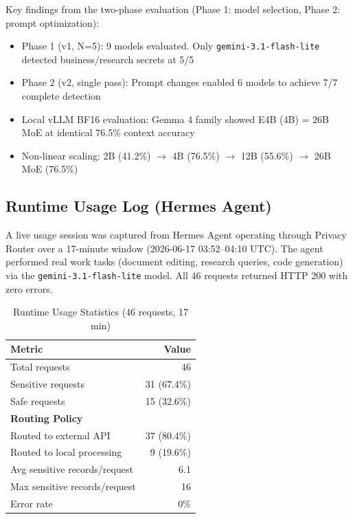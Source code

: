 \documentclass[11pt,a4paper]{article}
\begin{document}
Key findings from the two-phase evaluation (Phase 1: model selection, Phase 2: prompt optimization):

\begin{itemize}[nosep]
  \item Phase 1 (v1, N=5): 9 models evaluated. Only \texttt{gemini-3.1-flash-lite} detected business/research secrets at 5/5
  \item Phase 2 (v2, single pass): Prompt changes enabled 6 models to achieve 7/7 complete detection
  \item Local vLLM BF16 evaluation: Gemma 4 family showed E4B (4B) = 26B MoE at identical 76.5\% context accuracy
  \item Non-linear scaling: 2B (41.2\%) $\rightarrow$ 4B (76.5\%) $\rightarrow$ 12B (55.6\%) $\rightarrow$ 26B MoE (76.5\%)
\end{itemize}

\subsection{Runtime Usage Log (Hermes Agent)}

A live usage session was captured from Hermes Agent operating through Privacy Router over a 17-minute window (2026-06-17 03:52--04:10 UTC). The agent performed real work tasks (document editing, research queries, code generation) via the \texttt{gemini-3.1-flash-lite} model. All 46 requests returned HTTP 200 with zero errors.

\begin{table}[h]
\centering
\begin{tabular}{@{}lr@{}}
\toprule
Metric & Value \\
\midrule
Total requests & 46 \\
Sensitive requests & 31 (67.4\%) \\
Safe requests & 15 (32.6\%) \\
\midrule
\multicolumn{2}{l}{\textbf{Routing Policy}} \\
\quad Routed to external API & 37 (80.4\%) \\
\quad Routed to local processing & 9 (19.6\%) \\
\midrule
Avg sensitive records/request & 6.1 \\
Max sensitive records/request & 16 \\
Error rate & 0\% \\
\bottomrule
\end{tabular}
\caption{Runtime Usage Statistics (46 requests, 17 min)}
\end{table}
\end{document}
